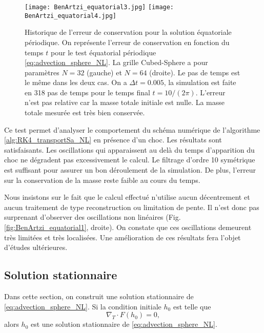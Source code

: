 \begin{figure}[htbp]
\begin{center}
\texttt{[image: BenArtzi\_equatorial3.jpg]}
\texttt{[image: BenArtzi\_equatorial4.jpg]}
\end{center}
\caption{Historique de l'erreur de conservation pour la solution équatoriale périodique. On représente l'erreur de conservation en fonction du temps $t$ pour le test équatorial périodique \eqref{eq:advection_sphere_NL}. La grille Cubed-Sphere a pour paramètres $N=32$ (gauche) et $N=64$ (droite). Le pas de temps est le même dans les deux cas. On a $\Delta t = 0.005$, la simulation est faite en 318 pas de temps pour le temps final $t=10/(2\pi)$. L'erreur n'est pas relative car la masse totale initiale est nulle. La masse totale mesurée est très bien conservée.}
\label{fig:BenArtzi_equatorial3}
\end{figure} 

Ce test permet d'analyser le comportement du schéma numérique de l'algorithme \ref{alg:RK4_transportSa_NL} en présence d'un choc. Les résultats sont satisfaisants. Les oscillations qui apparaissent au delà du temps d'apparition du choc ne dégradent pas excessivement le calcul. Le filtrage d'ordre 10 symétrique est suffisant pour assurer un bon déroulement de la simulation. De plus, l'erreur sur la conservation de la masse reste faible au cours du temps.

Nous insistons sur le fait que le calcul effectué n'utilise aucun décentrement et aucun traitement de type reconstruction ou limitation de pente. Il n'est donc pas surprenant d'observer des oscillations non linéaires (Fig. \ref{fig:BenArtzi_equatorial1}, droite). On constate que ces oscillations demeurent très limitées et très localisées. Une amélioration de ces résultats fera l'objet d'études ultérieures.





















\subsection{Solution stationnaire}

Dans cette section, on construit une solution stationnaire de \eqref{eq:advection_sphere_NL}. Si la condition initiale $h_0$ est telle que
\begin{equation}
\nabla_T \cdot F(h_0) = 0,
\end{equation}
alors $h_0$ est une solution stationnaire de \eqref{eq:advection_sphere_NL}.

